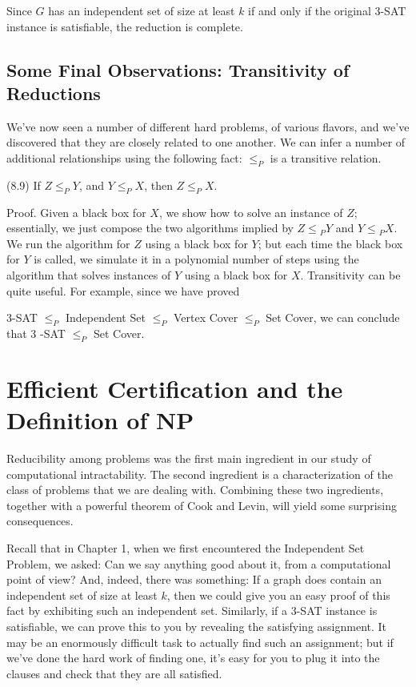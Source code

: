\documentclass[a4paper, 12pt]{book}
\theoremstyle{dotless}
\begin{document}
Since $G$ has an independent set of size at least $k$ if and only if the original 3-SAT instance is satisfiable, the reduction is complete.

\subsection{Some Final Observations: Transitivity of Reductions}
We've now seen a number of different hard problems, of various flavors, and we've discovered that they are closely related to one another. We can infer a number of additional relationships using the following fact: $\leq_{P}$ is a transitive relation.

(8.9) If $Z \leq_{P} Y$, and $Y \leq_{P} X$, then $Z \leq_{P} X$.

Proof. Given a black box for $X$, we show how to solve an instance of $Z$; essentially, we just compose the two algorithms implied by $Z \leq{ }_{P} Y$ and $Y \leq{ }_{P} X$. We run the algorithm for $Z$ using a black box for $Y$; but each time the black box for $Y$ is called, we simulate it in a polynomial number of steps using the algorithm that solves instances of $Y$ using a black box for $X$. Transitivity can be quite useful. For example, since we have proved

3-SAT $\leq_{P}$ Independent Set $\leq_{P}$ Vertex Cover $\leq_{P}$ Set Cover, we can conclude that 3 -SAT $\leq_{P}$ Set Cover.

\section{Efficient Certification and the Definition of NP}
Reducibility among problems was the first main ingredient in our study of computational intractability. The second ingredient is a characterization of the class of problems that we are dealing with. Combining these two ingredients, together with a powerful theorem of Cook and Levin, will yield some surprising consequences.

Recall that in Chapter 1, when we first encountered the Independent Set Problem, we asked: Can we say anything good about it, from a computational point of view? And, indeed, there was something: If a graph does contain an independent set of size at least $k$, then we could give you an easy proof of this fact by exhibiting such an independent set. Similarly, if a 3-SAT instance is satisfiable, we can prove this to you by revealing the satisfying assignment. It may be an enormously difficult task to actually find such an assignment; but if we've done the hard work of finding one, it's easy for you to plug it into the clauses and check that they are all satisfied.
\end{document}

